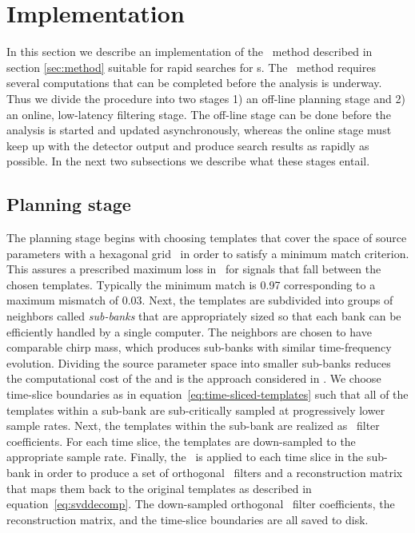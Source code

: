 \section{Implementation}
\label{sec:implementation}

In this section we describe an implementation of the \lloid\ method described
in section \ref{sec:method} suitable for rapid \GW{}
searches for \CBC{}s.  The \lloid\ method requires several
computations that can be completed before the analysis is underway.  Thus
we divide the procedure into two stages 1) an off-line planning stage and 2) an
online, low-latency filtering stage.  The off-line stage can be done before the
analysis is started and updated asynchronously, whereas the online stage must
keep up with the detector output and produce search results as rapidly as
possible.  In the next two subsections we describe what these stages entail.

\subsection{Planning stage}

The planning stage begins with choosing templates that cover the space of
source parameters with a hexagonal grid~\citep{PhysRevD.76.102004} in order to
satisfy a minimum match criterion.  This assures a prescribed maximum loss in
\SNR\ for signals that fall between the chosen templates.  Typically the
minimum match is 0.97 corresponding to a maximum mismatch of 0.03.  Next, the
templates are subdivided into groups of neighbors called \emph{sub-banks} that
are appropriately sized so that each bank can be efficiently handled by a
single computer.  The neighbors are chosen to have comparable chirp mass, which
produces sub-banks with similar time-frequency evolution.  Dividing the source
parameter space into smaller sub-banks reduces the computational cost of the
\SVD{} and is the approach considered
in \citet{Cannon:2010p10398}.  We choose time-slice boundaries as in
equation~\eqref{eq:time-sliced-templates} such that all of the templates within
a sub-bank are sub-critically sampled at progressively lower sample rates.
Next, the templates within the sub-bank are realized as \fir\ filter
coefficients.  For each time slice, the templates are down-sampled to the
appropriate sample rate.  Finally, the \SVD\ is applied to each time slice in
the sub-bank in order to produce a set of orthogonal \fir\ filters and a
reconstruction matrix that maps them back to the original templates as
described in equation~\eqref{eq:svddecomp}.  The down-sampled orthogonal \fir\
filter coefficients, the reconstruction matrix, and the time-slice boundaries
are all saved to disk.

